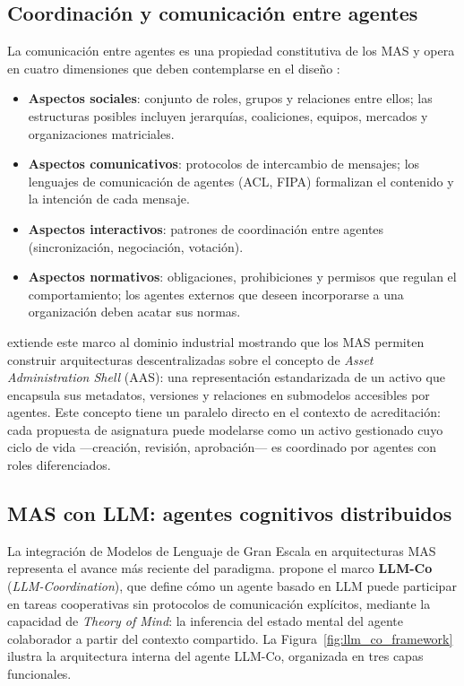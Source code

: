 \subsection{Coordinación y comunicación entre agentes}

La comunicación entre agentes es una propiedad constitutiva de los MAS y opera en cuatro dimensiones que deben contemplarse en el diseño \citep{perez2022breve}:

\begin{itemize}
    \item \textbf{Aspectos sociales}: conjunto de roles, grupos y relaciones entre ellos; las estructuras posibles incluyen jerarquías, coaliciones, equipos, mercados y organizaciones matriciales.
    \item \textbf{Aspectos comunicativos}: protocolos de intercambio de mensajes; los lenguajes de comunicación de agentes (ACL, FIPA) formalizan el contenido y la intención de cada mensaje.
    \item \textbf{Aspectos interactivos}: patrones de coordinación entre agentes (sincronización, negociación, votación).
    \item \textbf{Aspectos normativos}: obligaciones, prohibiciones y permisos que regulan el comportamiento; los agentes externos que deseen incorporarse a una organización deben acatar sus normas.
\end{itemize}

\citet{sakurada2021multi} extiende este marco al dominio industrial mostrando que los MAS permiten construir arquitecturas descentralizadas sobre el concepto de \textit{Asset Administration Shell} (AAS): una representación estandarizada de un activo que encapsula sus metadatos, versiones y relaciones en submodelos accesibles por agentes. Este concepto tiene un paralelo directo en el contexto de acreditación: cada propuesta de asignatura puede modelarse como un activo gestionado cuyo ciclo de vida ---creación, revisión, aprobación--- es coordinado por agentes con roles diferenciados.

\subsection{MAS con LLM: agentes cognitivos distribuidos}

La integración de Modelos de Lenguaje de Gran Escala en arquitecturas MAS representa el avance más reciente del paradigma. \citet{agashe2023llm} propone el marco \textbf{LLM-Co} (\textit{LLM-Coordination}), que define cómo un agente basado en LLM puede participar en tareas cooperativas sin protocolos de comunicación explícitos, mediante la capacidad de \textit{Theory of Mind}: la inferencia del estado mental del agente colaborador a partir del contexto compartido. La Figura~\ref{fig:llm_co_framework} ilustra la arquitectura interna del agente LLM-Co, organizada en tres capas funcionales.

